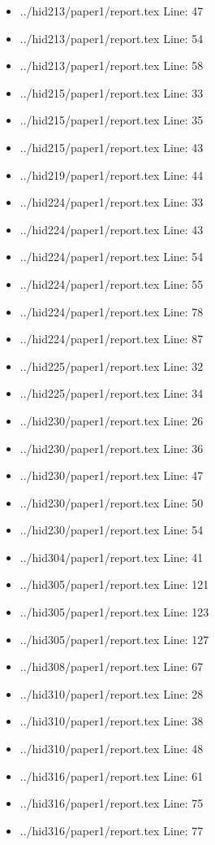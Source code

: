 \begin{itemize}
\item
  ../hid213/paper1/report.tex Line: 47
\item
  ../hid213/paper1/report.tex Line: 54
\item
  ../hid213/paper1/report.tex Line: 58
\item
  ../hid215/paper1/report.tex Line: 33
\item
  ../hid215/paper1/report.tex Line: 35
\item
  ../hid215/paper1/report.tex Line: 43
\item
  ../hid219/paper1/report.tex Line: 44
\item
  ../hid224/paper1/report.tex Line: 33
\item
  ../hid224/paper1/report.tex Line: 43
\item
  ../hid224/paper1/report.tex Line: 54
\item
  ../hid224/paper1/report.tex Line: 55
\item
  ../hid224/paper1/report.tex Line: 78
\item
  ../hid224/paper1/report.tex Line: 87
\item
  ../hid225/paper1/report.tex Line: 32
\item
  ../hid225/paper1/report.tex Line: 34
\item
  ../hid230/paper1/report.tex Line: 26
\item
  ../hid230/paper1/report.tex Line: 36
\item
  ../hid230/paper1/report.tex Line: 47
\item
  ../hid230/paper1/report.tex Line: 50
\item
  ../hid230/paper1/report.tex Line: 54
\item
  ../hid304/paper1/report.tex Line: 41
\item
  ../hid305/paper1/report.tex Line: 121
\item
  ../hid305/paper1/report.tex Line: 123
\item
  ../hid305/paper1/report.tex Line: 127
\item
  ../hid308/paper1/report.tex Line: 67
\item
  ../hid310/paper1/report.tex Line: 28
\item
  ../hid310/paper1/report.tex Line: 38
\item
  ../hid310/paper1/report.tex Line: 48
\item
  ../hid316/paper1/report.tex Line: 61
\item
  ../hid316/paper1/report.tex Line: 75
\item
  ../hid316/paper1/report.tex Line: 77

\end{itemize}
